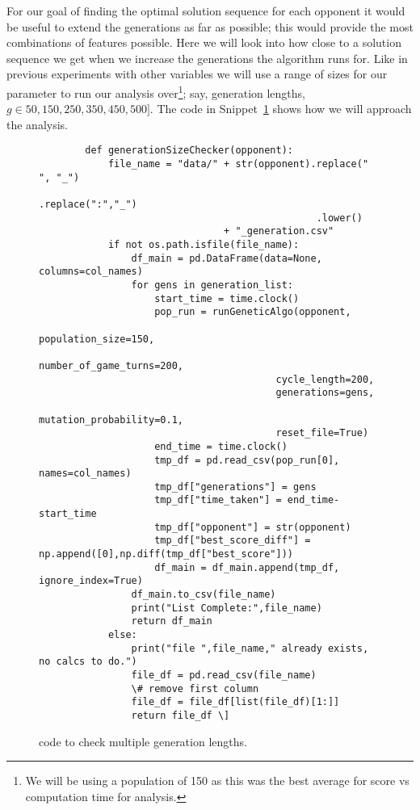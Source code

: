 For our goal of finding the optimal solution sequence for each opponent it would be useful to extend the generations as far as possible; this would provide the most combinations of features possible.
Here we will look into how close to a solution sequence we get when we increase the generations the algorithm runs for.
Like in previous experiments with other variables we will use a range of sizes for our parameter to run our analysis over\footnote{We will be using a population of 150 as this was the best average for score vs computation time for analysis.}; say, generation lengths, \(g \in 50,150,250,350,450,500]\). 
The code in Snippet~\ref{code:generationChecker} shows how we will approach the analysis.\\ 

\begin{figure}
    \begin{verbatim}
        def generationSizeChecker(opponent):
            file_name = "data/" + str(opponent).replace(" ", "_")
                                                .replace(":","_")
                                                .lower() 
                                + "_generation.csv"
            if not os.path.isfile(file_name):
                df_main = pd.DataFrame(data=None, columns=col_names)
                for gens in generation_list:
                    start_time = time.clock()
                    pop_run = runGeneticAlgo(opponent,
                                         population_size=150,
                                         number_of_game_turns=200,
                                         cycle_length=200, 
                                         generations=gens,
                                         mutation_probability=0.1, 
                                         reset_file=True)
                    end_time = time.clock()
                    tmp_df = pd.read_csv(pop_run[0], names=col_names)
                    tmp_df["generations"] = gens
                    tmp_df["time_taken"] = end_time-start_time
                    tmp_df["opponent"] = str(opponent)
                    tmp_df["best_score_diff"] = np.append([0],np.diff(tmp_df["best_score"]))
                    df_main = df_main.append(tmp_df, ignore_index=True)
                df_main.to_csv(file_name)
                print("List Complete:",file_name)
                return df_main
            else:
                print("file ",file_name," already exists, no calcs to do.")
                file_df = pd.read_csv(file_name) 
                \# remove first column
                file_df = file_df[list(file_df)[1:]]
                return file_df \]
    \end{verbatim}
    \caption{code to check multiple generation lengths.}\label{code:generationChecker}
\end{figure}
    
